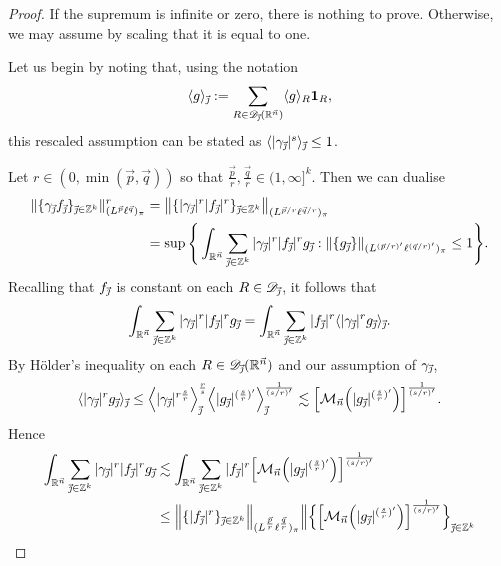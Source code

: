 \documentclass[11pt, reqno]{amsart}
\theoremstyle{definition}
\theoremstyle{remark}
\numberwithin{equation}{section}
\newcommand{\D}{\mathscr D}
\newcommand{\R}{\mathbb R}
\newcommand{\Z}{\mathbb Z}
\newcommand{\vj}{\vec{\textit{\j}}}
\newcommand{\vn}{\vec n}
\newcommand{\vp}{\vec p}
\newcommand{\vq}{\vec q}
\newcommand{\one}{\mathbf{1}}
\newcommand{\ave}[1]{\langle #1\rangle}
\newcommand{\Avee}[2]{\langle#1\rangle_{#2}}
\newcommand{\abs}[1]{|#1|}
\newcommand{\Norm}[2]{\|#1\|_{#2}}
\newcommand{\bNorm}[2]{\big\|#1\big\|_{#2}}
\begin{document}
\begin{proof}
If the supremum is infinite or zero, there is nothing to prove. Otherwise, we may assume by scaling that it is equal to one.

Let us begin by noting that, using the notation
\begin{equation*}
\Avee{g}{\vj}:=\sum_{R\in\D_{\vj}(\R^{\vn})}\ave{g}_R\one_R,
\end{equation*}
this rescaled assumption can be stated as $\Avee{\abs{\gamma_{\vj}}^s}{\vj}\leq 1$.

Let $r\in(0,\min(\vp,\vq))$ so that
$\frac{\vp}r,\frac{\vq}r\in(1,\infty]^k$. Then we can dualise
\begin{equation}\label{carl1}
\begin{split}
  \Norm{\{\gamma_{\vj}f_{\vj}\}_{\vj\in\mathbb Z^k}}{(L^{\vp}\ell^{\vq})_\pi}^r
&=\bNorm{\{\abs{\gamma_{\vj}}^r\abs{f_{\vj}}^r\}_{\vj\in\mathbb Z^k}}{(L^{\vp/r}\ell^{\vq/r})_\pi} \\
&=\sup\Bigg\{\int_{\R^{\vn}}\sum_{\vj\in\Z^k}\abs{\gamma_{\vj}}^r\abs{f_{\vj}}^r g_{\vj}:
\Norm{\{g_{\vj}\}}{(L^{(\vp/r)'}\ell^{(\vq/r)'})_\pi}\leq 1\Bigg\}.
\end{split}
\end{equation}
Recalling that $f_{\vj}$ is constant on each $R\in\mathscr D_{\vj}$, it follows that
\begin{equation*}
\int_{\R^{\vn}}\sum_{\vj\in\Z^k}\abs{\gamma_{\vj}}^r\abs{f_{\vj}}^r g_{\vj}
=\int_{\R^{\vn}}\sum_{\vj\in\Z^k}\abs{f_{\vj}}^r \Avee{\abs{\gamma_{\vj}}^r g_{\vj}}{\vj}.
\end{equation*}
By H\"older's inequality on each $R\in\D_{\vj}(\R^{\vn})$ and our assumption of $\gamma_{\vj}$,
\begin{equation*}
\Avee{\abs{\gamma_{\vj}}^r g_{\vj}}{\vj}
\leq \Big<|\gamma_{\vj}|^{r\frac sr}\Big>_{\vj}^{\frac rs}
\Big<|g_{\vj}|^{(\frac sr)'}\Big>_{\vj}^{\frac 1{(s/r)'}}
\lesssim \Big[\mathcal M_{\vn}\Big(\abs{g_{\vj}}^{(\frac sr)'}\Big)\Big]^{\frac{1}{(s/r)'}}.
\end{equation*}
Hence
\begin{align*}
\int_{\R^{\vn}}\sum_{\vj\in\Z^k}\abs{\gamma_{\vj}}^r\abs{f_{\vj}}^r g_{\vj}
&\lesssim\int_{\R^{\vn}}\sum_{\vj\in\Z^k}\abs{f_{\vj}}^r
\Big[\mathcal M_{\vn}\Big(\abs{g_{\vj}}^{(\frac sr)'}\Big)\Big]^{\frac{1}{(s/r)'}}\\
&\leq\Big\|\{\abs{f_{\vj}}^r\}_{\vj\in\Z^k}\Big\|_{(L^{\frac{\vp}r}
\ell^{\frac{\vq}r})_\pi}
\Big\|\Big\{\Big[\mathcal M_{\vn}\Big(\abs{g_{\vj}}^{(\frac sr)'}\Big)\Big]^{\frac{1}{(s/r)'}}\Big\}_{\vj\in\Z^k}

\end{align*}
\end{proof}
\end{document}
